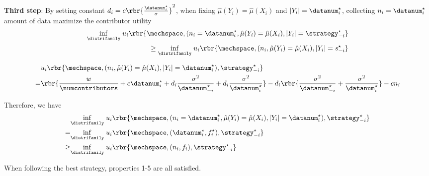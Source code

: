 \textbf{Third step}: By setting constant $d_i= c\rbr{\frac{\datanum_i^{\star}}{\sigma}}^2$, when fixing $\hat{\mu}(Y_i)=\hat{\mu}(X_i)$ and $\left| Y_i \right| = \datanum_i^{\star}$, collecting $n_i = \datanum_i^{\star}$ amount of data maximize the contributor utility 
\begin{align*}
    \underset{\distrifamily}{\inf}\;u_i\rbr{\mechspace, (n_i= \datanum_i^{\star},\hat{\mu}(Y_i)=\hat{\mu}(X_i), \left| Y_i \right|=\strategy_{-i}^{\star} } \\ \geq \underset{\distrifamily}{\inf}\;u_i\rbr{\mechspace, (n_i,\hat{\mu}(Y_i)=\hat{\mu}(X_i), \left| Y_i \right|=s_{-i}^{\star}}  
\end{align*}
 

\begin{align*}
    & u_i\rbr{\mechspace, (n_i,\hat{\mu}(Y_i)=\hat{\mu}(X_i), \left| Y_i \right|=\datanum_i^{\star}),\strategy_{-i}^{\star} }  \\ = & \rbr{\frac{w}{\numcontributors}+ c \datanum_i^{\star} +d_i \frac{\sigma^2}{\datanum_{-i}^{\star}} +d_i \frac{\sigma^2}{\datanum_i^{\star}} } - d_i \rbr{ \frac{\sigma^2}{\datanum_{-i}^{\star}} +\frac{\sigma^2}{\datanum_i^{\star}} } - cn_i
\end{align*}

Therefore, we have 
\begin{align*}
    &\underset{\distrifamily}{\inf}\;u_i \rbr{\mechspace, (n_i= \datanum_i^{\star},\hat{\mu}(Y_i)=\hat{\mu}(X_i), \left| Y_i \right|=\datanum_i^{\star}),\strategy_{-i}^{\star} } \\  = & \underset{\distrifamily}{\inf}\;u_i\rbr{\mechspace, (\datanum_i^{\star},f_i^{\star}),\strategy_{-i}^{\star} } \\ \geq &   \underset{\distrifamily}{\inf}\; u_i\rbr{\mechspace, (n_i,f_i ),\strategy_{-i}^{\star}} 
\end{align*}

When following the best strategy, properties 1-5 are all satisfied.


